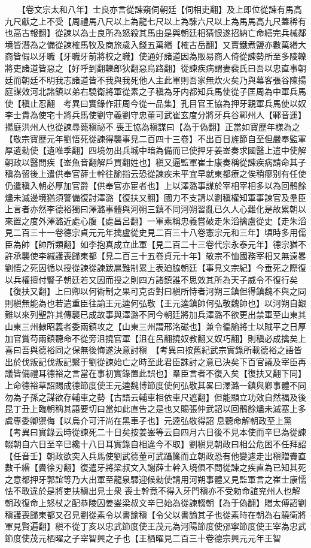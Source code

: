 　　【卷文宗太和八年】士良亦言從諫窺伺朝廷【伺相吏翻】及上即位從諫有馬高九尺獻之上不受【周禮馬八尺以上為龍七尺以上為騋六尺以上為馬馬高九尺蓋稀有也高古報翻】從諫以為士良所為怒殺其馬由是與朝廷相猜恨遂招納亡命繕完兵械鄰境皆潛為之備從諫榷馬牧及商旅歲入錢五萬緡【榷古岳翻】又賣鐵煮鹽亦數萬緡大商皆假以牙職【牙職牙前將校之職】使通好諸道因為販易商人倚從諫勢所至多陵轢將吏諸道皆惡之【好呼到翻轢郎狄翻惡烏路翻】從諫疾病謂妻裴氏曰吾以忠直事朝廷而朝廷不明我志諸道皆不我與我死他人主此軍則吾家無炊火矣乃與幕客張谷陳揚庭謀效河北諸鎮以弟右驍衛將軍從素之子稹為牙内都知兵馬使從子匡周為中軍兵馬使【稹止忍翻　考異曰實錄作莊周今從一品集】孔目官王協為押牙親軍兵馬使以奴李士貴為使宅十將兵馬使劉守義劉守忠董可武崔玄度分將牙兵谷鄆州人【鄆音運】揚庭洪州人也從諫尋薨稹祕不喪王協為稹謀曰【為于偽翻】正當如寶歷年様為之【敬宗寶歷元年劉悟死從諫得襲事見二百四十三卷】不出百日旌節自至但嚴奉監軍厚遺勑使【遺唯季翻】四境勿出兵城中暗為備而已使押牙姜崟奏求國醫上遣中使解朝政以醫問疾【崟魚音翻解戶買翻姓也】稹又逼監軍崔士康奏稱從諫疾病請命其子稹為留後上遣供奉官薛士幹往諭指云恐從諫疾未平宜早就東都療之俟稍瘳别有任使仍遣稹入朝必厚加官爵【供奉官亦宦者也】上以澤潞事謀於宰相宰相多以為回鶻餘燼未滅邊境猶須警備復討澤潞【復扶又翻】國力不支請以劉稹權知軍事諫官及羣臣上言者亦然李德裕獨曰澤潞事體與河朔三鎮不同河朔習亂已久人心難化是故累朝以來置之度外澤潞近處心腹【處昌呂翻】一軍素稱忠義嘗破走朱滔擒盧從史【走朱滔見二百三十一卷德宗貞元元年擒盧從史見二百三十八卷憲宗元和三年】頃時多用儒臣為帥【帥所類翻】如李抱真成立此軍【見二百二十三卷代宗永泰元年】德宗猶不許承襲使李緘護喪歸東都【見二百三十五卷貞元十年】敬宗不恤國務宰相又無遠畧劉悟之死因循以授從諫從諫跋扈難制累上表廹脇朝廷【事見文宗紀】今垂死之際復以兵權擅付豎子朝廷若又因而授之則四方諸鎮誰不思效其所為天子威令不復行矣【復扶又翻】上曰卿以何術制之果可克否對曰稹所恃者河朔三鎮但得鎮魏不與之同則稹無能為也若遣重臣往諭王元逵何弘敬【王元逵鎮帥何弘敬魏帥也】以河朔自艱難以來列聖許其傳襲已成故事與澤潞不同今朝廷將加兵澤潞不欲更出禁軍至山東其山東三州隸昭義者委兩鎮攻之【山東三州謂邢洺磁也】兼令徧諭將士以賊平之日厚加官賞苟兩鎮聽命不從旁沮撓官軍【沮在呂翻撓奴教翻又奴巧翻】則稹必成擒矣上喜曰吾與德裕同之保無後悔遂決意討稹　【考異曰按舊紀武宗實錄所載德裕之語皆出於伐叛記伐叛記繫于劉從諫始亡之時至此君臣誅討之意已決矣下百官議及宰臣再議皆備禮耳德裕之言當在事初實錄置此誤也】羣臣言者不復入矣【復扶又翻下同】上命德裕草詔賜成德節度使王元逵魏博節度使何弘敬其畧曰澤潞一鎮與卿事體不同勿為子孫之謀欲存輔車之勢【古語云輔車相依車尺遮翻】但能顯立功效自然福及後昆丁丑上臨朝稱其語要切曰當如此直告之是也又賜張仲武詔以回鶻餘燼未滅塞上多虞專委卿禦侮【以烏介可汗尚在黑車子也】元逵弘敬得詔息聽命解朝政至上黨【考異曰實錄云時從諫死二十日矣按姜崟等云自四月六日後不見本使而辛巳為從諫輟朝自六日至辛巳纔十八日耳實錄自相違今不取】劉稹見朝政曰相公危困不任拜詔【任音壬】朝政欲突入兵馬使劉武德董可武躡簾而立朝政恐有他變遽走出稹贈賮直數千緡【賮徐刃翻】復遣牙將梁叔文入謝薛士幹入境俱不問從諫之疾直為已知其死之意都押牙郭誼等乃大出軍至龍泉驛迎候勑使請用河朔事體又見監軍言之崔士康懦怯不敢違於是將吏扶稹出見士衆喪士幹竟不得入牙門稹亦不受勑命誼兖州人也解朝政復命上怒杖之配恭陵囚姜崟梁叔文辛巳始為從諫輟朝【為于偽翻】贈太傅詔劉稹護喪歸東都又召見劉從素令以書諭稹【令父以書諭其子也從素時在朝為右驍衛將軍見賢遍翻】稹不從丁亥以忠武節度使王茂元為河陽節度使邠寧節度使王宰為忠武節度使茂元栖曜之子宰智興之子也【王栖曜見二百三十卷德宗興元元年王智